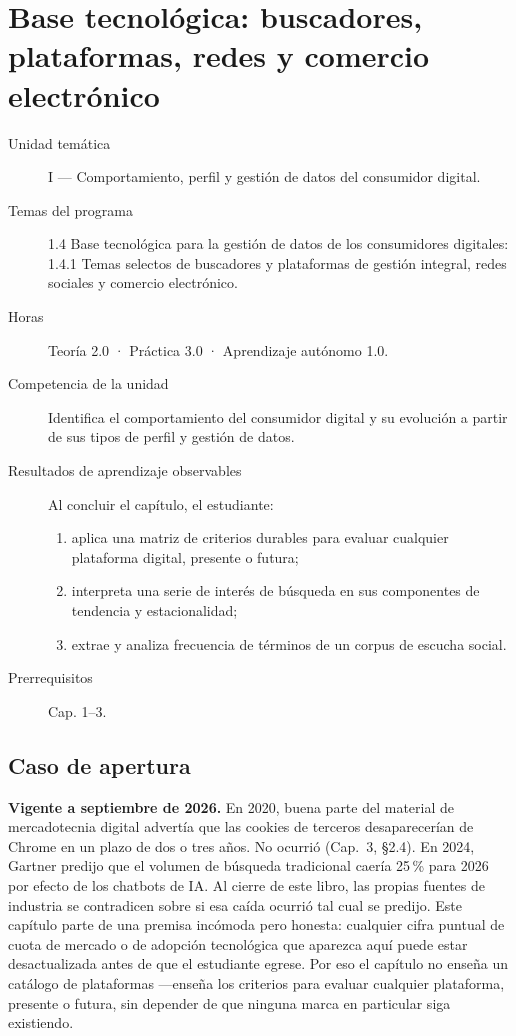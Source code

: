 \chapter{Base tecnológica: buscadores, plataformas, redes y comercio electrónico}
\label{cap:04}

\begin{cajaFicha}
\begin{description}
  \item[Unidad temática] I — Comportamiento, perfil y gestión de datos del consumidor digital.
  \item[Temas del programa] 1.4 Base tecnológica para la gestión de datos de los consumidores digitales: 1.4.1 Temas selectos de buscadores y plataformas de gestión integral, redes sociales y comercio electrónico.
  \item[Horas] Teoría 2.0 · Práctica 3.0 · Aprendizaje autónomo 1.0.
  \item[Competencia de la unidad] Identifica el comportamiento del consumidor digital y su evolución a partir de sus tipos de perfil y gestión de datos.
  \item[Resultados de aprendizaje observables] Al concluir el capítulo, el estudiante:
  \begin{enumerate}
    \item aplica una matriz de criterios durables para evaluar cualquier plataforma digital, presente o futura;
    \item interpreta una serie de interés de búsqueda en sus componentes de tendencia y estacionalidad;
    \item extrae y analiza frecuencia de términos de un corpus de escucha social.
  \end{enumerate}
  \item[Prerrequisitos] Cap. 1--3.
\end{description}
\end{cajaFicha}

\section{Caso de apertura}

\textbf{Vigente a septiembre de 2026.} En 2020, buena parte del material de
mercadotecnia digital advertía que las cookies de terceros desaparecerían de
Chrome en un plazo de dos o tres años. No ocurrió (Cap.~3, §2.4). En 2024,
Gartner predijo que el volumen de búsqueda tradicional caería 25\,\% para
2026 por efecto de los chatbots de IA. Al cierre de este libro, las propias
fuentes de industria se contradicen sobre si esa caída ocurrió tal cual se
predijo. Este capítulo parte de una premisa incómoda pero honesta: cualquier
cifra puntual de cuota de mercado o de adopción tecnológica que aparezca
aquí puede estar desactualizada antes de que el estudiante egrese. Por eso
el capítulo no enseña un catálogo de plataformas —enseña los criterios para
evaluar cualquier plataforma, presente o futura, sin depender de que ninguna
marca en particular siga existiendo.

